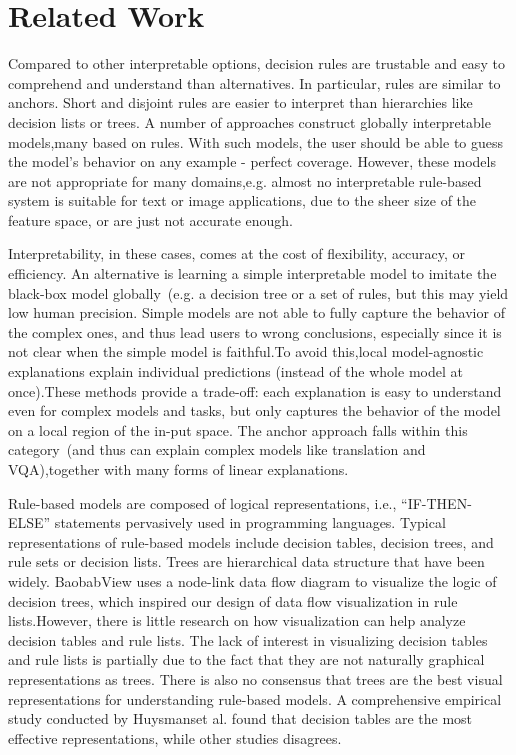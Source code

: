 \section{Related Work} \label{chapter_7:rw}
Compared to other interpretable options, decision rules are trustable and easy to comprehend and understand than alternatives. In particular, rules are similar to anchors. Short and disjoint rules are easier to interpret than hierarchies like decision lists or trees. A number of approaches construct globally interpretable models,many based on rules. With such models, the user should be able to guess the model’s behavior on any example - perfect coverage. However, these models are not appropriate for many domains,e.g. almost no interpretable rule-based system is suitable for text or image applications, due to the sheer size of the feature space, or are just not accurate enough. 

\hspace*{3.5mm} Interpretability, in these cases, comes at the cost of flexibility, accuracy, or efficiency. An alternative is learning a simple interpretable model to imitate the black-box model globally~(e.g. a decision tree or a set of rules, but this may yield low human precision. Simple models are not able to fully capture the behavior of the complex ones, and thus lead users to wrong conclusions, especially since it is not clear when the simple model is faithful.To avoid this,local model-agnostic explanations explain individual predictions (instead of the whole model at once).These methods provide a trade-off: each explanation is easy to understand even for complex models and tasks, but only captures the behavior of the model on a local region of the in-put space. The anchor approach falls within this category~(and thus can explain complex models like translation and VQA),together with many forms of linear explanations.

\hspace*{3.5mm} Rule-based models are composed of logical representations, i.e., ``IF-THEN-ELSE'' statements pervasively used in programming languages. Typical representations of rule-based models include decision tables, decision trees, and rule sets or decision lists. Trees are hierarchical data structure that have been widely. BaobabView uses a node-link data flow diagram to visualize the logic of decision trees, which inspired our design of data flow visualization in rule lists.However, there is little research on how visualization can help analyze decision tables and rule lists. The lack of interest in visualizing decision tables and rule lists is partially due to the fact that they are not naturally graphical representations as trees. There is also no consensus that trees are the best visual representations for understanding rule-based models. A comprehensive empirical study conducted by Huysmanset al. found that decision tables are the most effective representations, while other studies disagrees. 

